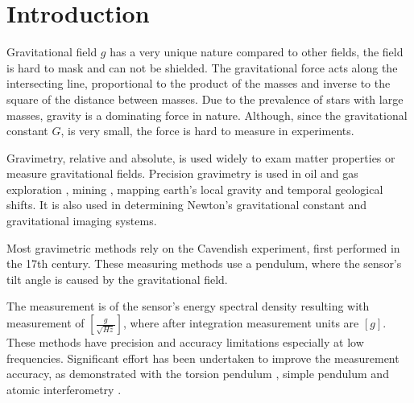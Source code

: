 \documentclass[\main/master.tex]{subfiles}
\begin{document}
\chapter{Introduction}\label{chapter:Introduction}


Gravitational field $g$ has a very unique nature compared to other fields, the field is hard to mask and can not be shielded. The gravitational force acts along the intersecting line, proportional to the product of the masses and inverse to the square of the distance between masses. Due to the prevalence of stars with large masses, gravity is a dominating force in nature. Although, since the gravitational constant $G$, is very small, the force is hard to measure in experiments. 
\par\noindent
Gravimetry, relative and absolute, is used widely to exam matter properties or measure gravitational fields. Precision gravimetry \cite{Wahr04,Bingham10,Bell98,Leeuwen00,Diorio03,Romaides01,Peters01,Luther82,Kuroda95,Karagioz96,Bagley97,Gundlach00,Quinn01,Armstrong03,Kleinevoss99,Parks10,Peters99,Mcguirk02,Dimopoulos07,Lamporesi08,Sorrentino10,Rosi14,Goodkind99} is used in oil and gas exploration \cite{Bell98}, mining \cite{Leeuwen00}, mapping earth's local gravity \cite{Wahr04,Bingham10} and temporal geological shifts. It is also used in determining Newton's gravitational constant \cite{Luther82, Kuroda95, Karagioz96, Bagley97, Gundlach00, Quinn01, Armstrong03, Kleinevoss99, Parks10, Peters99, Mcguirk02, Dimopoulos07, Lamporesi08, Sorrentino10, Rosi14} and gravitational imaging systems. 
\par\noindent
Most gravimetric methods rely on the Cavendish experiment, first performed in the 17th century. These measuring methods use a pendulum, where the sensor's tilt angle is caused by the gravitational field. 
\par\noindent
The measurement is of the sensor's energy spectral density resulting with measurement of $[\frac{g}{\sqrt{Hz}}]$, where after integration measurement units are $[g]$. These methods have precision and accuracy limitations especially at low frequencies. Significant effort has been undertaken to improve the measurement accuracy, as demonstrated with the torsion pendulum \cite{Luther82,Kuroda95,Karagioz96,Bagley97,Gundlach00,Quinn01,Armstrong03}, simple pendulum \cite {Kleinevoss99,Parks10} and atomic interferometry \cite{Lamporesi08,Sorrentino10,Rosi14}.
\iffalse
\end{document}
